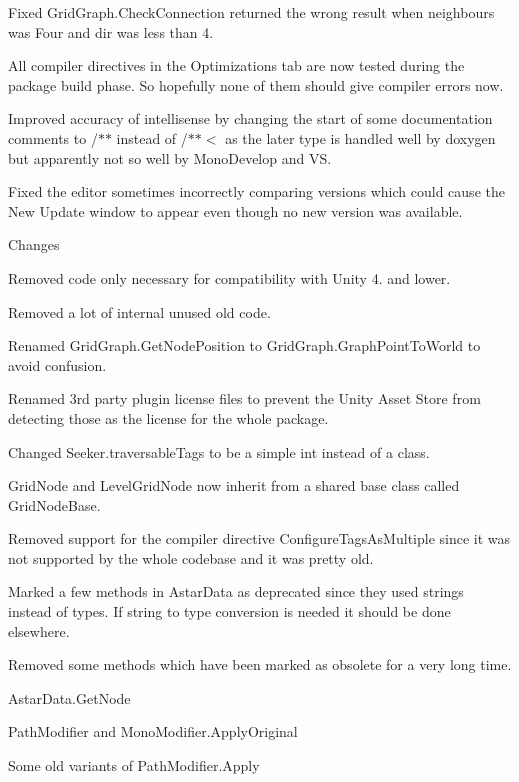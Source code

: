 \begin{DoxyItemize}
\begin{DoxyItemize}
\begin{DoxyItemize}
\item Fixed Grid\+Graph.\+Check\+Connection returned the wrong result when neighbours was Four and dir was less than 4.
\item All compiler directives in the Optimizations tab are now tested during the package build phase. So hopefully none of them should give compiler errors now.
\item Improved accuracy of intellisense by changing the start of some documentation comments to /$\ast$$\ast$ instead of /$\ast$$\ast$$<$ as the later type is handled well by doxygen but apparently not so well by Mono\+Develop and VS.
\item Fixed the editor sometimes incorrectly comparing versions which could cause the \textquotesingle{}New Update\textquotesingle{} window to appear even though no new version was available.
\end{DoxyItemize}
\item Changes
\begin{DoxyItemize}
\item Removed code only necessary for compatibility with Unity 4. and lower.
\item Removed a lot of internal unused old code.
\item Renamed Grid\+Graph.\+Get\+Node\+Position to Grid\+Graph.\+Graph\+Point\+To\+World to avoid confusion.
\item Renamed 3rd party plugin license files to prevent the Unity Asset Store from detecting those as the license for the whole package.
\item Changed Seeker.\+traversable\+Tags to be a simple int instead of a class.
\item Grid\+Node and Level\+Grid\+Node now inherit from a shared base class called Grid\+Node\+Base.
\item Removed support for the compiler directive Configure\+Tags\+As\+Multiple since it was not supported by the whole codebase and it was pretty old.
\item Marked a few methods in Astar\+Data as deprecated since they used strings instead of types. If string to type conversion is needed it should be done elsewhere.
\item Removed some methods which have been marked as obsolete for a very long time.
\begin{DoxyItemize}
\item Astar\+Data.\+Get\+Node
\item Path\+Modifier and Mono\+Modifier.\+Apply\+Original
\item Some old variants of Path\+Modifier.\+Apply

\end{DoxyItemize}
\end{DoxyItemize}
\end{DoxyItemize}
\end{DoxyItemize}
